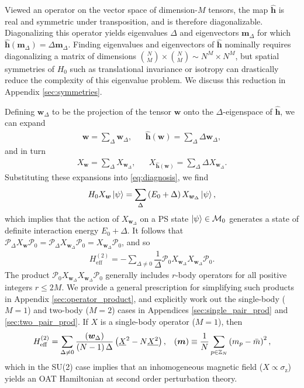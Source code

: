 \documentclass[nofootinbib,notitlepage,11pt]{revtex4-2}
\renewcommand{\t}{\text} %
\newcommand{\f}[2]{\dfrac{#1}{#2}} %
\newcommand{\p}[1]{\left(#1\right)} %
\newcommand{\m}{\bm} %
\newcommand{\1}{\mathds{1}}
\newcommand{\z}{\text{z}}
\newcommand{\M}{\mathcal{M}}
\renewcommand{\P}{\mathcal{P}}
\newcommand{\ZZ}{\mathbb{Z}}
\newcommand{\col}{\underline}
\let\var\relax
\DeclareMathOperator{\var}{var}
\begin{document}
Viewed an operator on the vector space of dimension-$M$ tensors, the
map $\hat{\m h}$ is real and symmetric under transposition, and is
therefore diagonalizable.  Diagonalizing this operator yields
eigenvalues $\Delta$ and eigenvectors $\m m_\Delta$ for which
$\hat{\m h}\p{\m m_\Delta}=\Delta\m m_\Delta$.  Finding eigenvalues
and eigenvectors of $\hat{\m h}$ nominally requires diagonalizing a
matrix of dimensions
${N\choose M}\times{N\choose M}\sim N^M\times N^M$, but spatial
symmetries of $H_0$ such as translational invariance or isotropy can
drastically reduce the complexity of this eigenvalue problem.  We
discuss this reduction in Appendix \ref{sec:symmetries}.

Defining $\m w_\Delta$ to be the projection of the tensor $\m w$ onto
the $\Delta$-eigenspace of $\hat{\m h}$, we can expand
\begin{align}
  \m w = \sum_\Delta \m w_\Delta,
  &&
  \hat{\m h}\p{\m w} = \sum_\Delta \Delta \m w_\Delta,
\end{align}
and in turn
\begin{align}
  X_{\m w} = \sum_\Delta X_{\m w_\Delta},
  &&
  X_{\hat{\m h}\p{\m w}} = \sum_\Delta \Delta X_{\m w_\Delta}.
\end{align}
Substituting these expansions into \eqref{eq:diagnosis}, we find
\begin{align}
  H_0 X_{\m w} \ket\psi
  = \sum_\Delta\p{E_0 + \Delta} X_{\m w_\Delta} \ket\psi,
\end{align}
which implies that the action of $X_{\m w_\Delta}$ on a PS state
$\ket\psi\in\M_0$ generates a state of definite interaction energy
$E_0+\Delta$.  It follows that
$\P_\Delta X_{\m w} \P_0 = \P_\Delta X_{\m w_\Delta} \P_0 = X_{\m
  w_\Delta} \P_0$, and so
\begin{align}
  H_{\t{eff}}^{(2)} = -\sum_{\Delta\ne0}
  \f1\Delta \P_0 X_{\m w_\Delta} X_{\m w_\Delta} \P_0.
\end{align}
The product $\P_0 X_{\m w_\Delta} X_{\m w_\Delta} \P_0$ generally
includes $r$-body operators for all positive integers $r\le2M$.  We
provide a general prescription for simplifying such products in
Appendix \ref{sec:operator_product}, and explicitly work out the
single-body ($M=1$) and two-body ($M=2$) cases in Appendices
\ref{sec:single_pair_prod} and \ref{sec:two_pair_prod}.  If $X$ is a
single-body operator ($M=1$), then
\begin{align}
  H_{\t{eff}}^{(2)}
  = \sum_{\Delta\ne0} \f{\var\p{\m w_\Delta}}{\p{N-1}\Delta}
  \p{\col{X}^2 - N \col{X^2}},
  &&
  \var\p{\m m} \equiv \f1N \sum_{p\in\ZZ_N} \p{m_p-\bar m}^2,
\end{align}
which in the SU(2) case implies that an inhomogeneous magnetic field
($X\propto\sigma_\z$) yields an OAT Hamiltonian at second order
perturbation theory.
\end{document}

